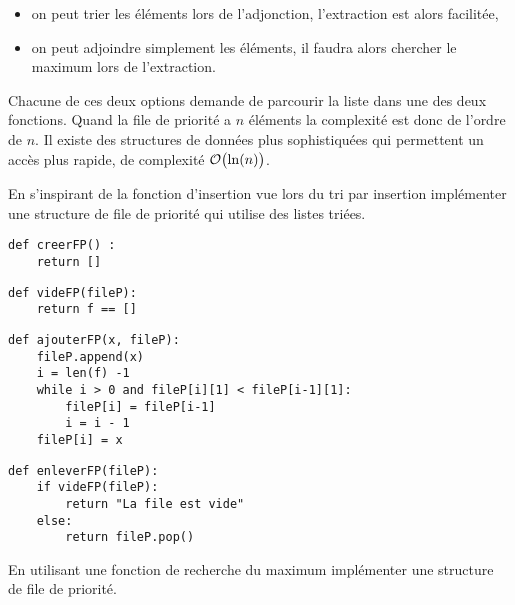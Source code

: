 \begin{itemize}
\item on peut trier les éléments lors de l'adjonction, l'extraction est alors facilitée,
\item on peut adjoindre simplement les éléments, il faudra alors chercher le maximum lors de l'extraction.
\end{itemize} 
Chacune de ces deux options demande de parcourir la liste dans une des deux fonctions. Quand la file de priorité a $n$ éléments la complexité est donc de l'ordre de $n$. Il existe des structures de données plus sophistiquées qui permettent un accès plus rapide, de complexité ${\cal O}\bigl(\ln(n)\bigr)$.
\begin{Exercise}[title = {File de priorité avec des listes triées}]\it 

En s'inspirant de la fonction d'insertion vue lors du tri par insertion implémenter une structure de file de priorité qui utilise des listes triées.
\end{Exercise} 
\begin{Answer}
\begin{lstlisting}
def creerFP() :
    return []
\end{lstlisting}

\begin{lstlisting}
def videFP(fileP):
    return f == []
\end{lstlisting}

\begin{lstlisting}
def ajouterFP(x, fileP):
    fileP.append(x)
    i = len(f) -1
    while i > 0 and fileP[i][1] < fileP[i-1][1]:
        fileP[i] = fileP[i-1]
        i = i - 1
    fileP[i] = x
\end{lstlisting}

\begin{lstlisting}
def enleverFP(fileP):
    if videFP(fileP):
        return "La file est vide"
    else:
        return fileP.pop()
\end{lstlisting}
\end{Answer}%
\begin{Exercise}[title = {File de priorité avec des listes non triées}]\it

En utilisant une fonction de recherche du maximum implémenter une structure de file de priorité.\end{Exercise} 
